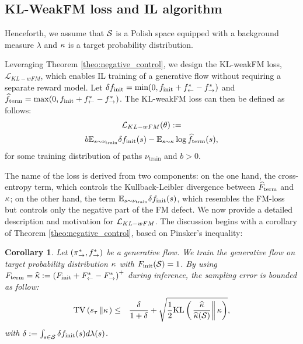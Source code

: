 \documentclass{article}
\theoremstyle{plain}
\newtheorem{corollary}[theorem]{Corollary}
\theoremstyle{definition}
\theoremstyle{remark}
\theoremstyle{fact}
\begin{document}
\subsection{KL-WeakFM loss and IL algorithm}
\label{sec:ILloss}
Henceforth, we assume that $\mathcal S$ is a Polish space equipped with a background measure $\lambda$ and $\kappa$ is a target probability distribution.

Leveraging Theorem \ref{theo:negative_control}, we design the KL-weakFM loss, $\mathcal L_{KL-wFM}$, which enables IL training of a generative flow without requiring a separate reward model.
Let $\delta f_{\mathrm{init}}=\min(0,f_{\mathrm{init}}+f^*_{\leftarrow}-f^*_{\rightarrow})$  and $\widehat{f}_{\mathrm{term}} = \max(0,f_{\mathrm{init}}+f^*_{\leftarrow}-f^*_{\rightarrow})$. The KL-weakFM loss can then be defined as follows:
\begin{multline}\label{equ:weakFM}
     \mathcal L_{KL-wFM} (\theta) :=\\ b\mathbb E_{s\sim \nu_{\mathrm{train}}} \delta f_{\mathrm{init}}( s)-  \mathbb E_{s\sim \kappa}\log \widehat{f}_{\mathrm{term}}(s),
\end{multline}
for some training distribution of paths $\nu_{\mathrm{train}}$ and  $b>0$.

The name of the loss is derived from two components: on the one hand, the cross-entropy term, which controls the Kullback-Leibler divergence between $\widehat{F}_{\mathrm{term}}$ and $\kappa$; on the other hand, the term  $\mathbb E_{s\sim \nu_{\mathrm{train}}} \delta f_{\mathrm{init}}( s)$, which resembles the FM-loss but controls only the negative part of the FM defect.
We now provide a detailed description and motivation for $\mathcal L_{KL-wFM}$. The discussion begins with a corollary of Theorem \ref{theo:negative_control}, based on Pinsker's inequality:


\begin{corollary} \label{cor:pinsker_negative_control}
Let $(\pi_{\rightarrow}^*, f^*_{\rightarrow})$ be a generative flow. We train the generative flow on target probability distribution $\kappa$ with $F_{\mathrm{init}}(\mathcal S)=1$. By using $F_{\mathrm{term}}=\widehat{\kappa}:=  \left(F_{\mathrm{init}}+F^*_{\leftarrow}-F^*_{\rightarrow}\right)^+$ during inference, the sampling error is bounded as follow:
\begin{eqnarray}\label{equ:control_pinsker}
  \mathrm{TV}\left(s_\tau \left\| \kappa \right.\right) &\leq&  \frac{\delta}{1+\delta} +\sqrt{\frac{1}{2}\mathrm{KL}\left(\left.\frac{\widehat{\kappa}}{\widehat{\kappa}(\mathcal S)} \right\| \kappa \right)},
\end{eqnarray}
with $\delta :=  \int_{s\in\mathcal S} \delta f_{\mathrm{init}}(s)d\lambda(s)$.
\end{corollary}
\end{document}

